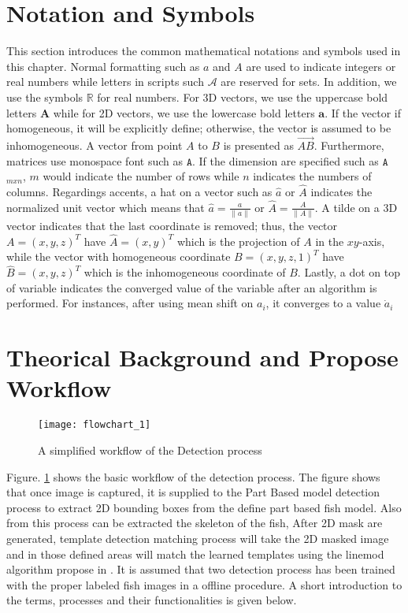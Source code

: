 \section{Notation and Symbols}
This section introduces the common mathematical notations and symbols used in this 
chapter.
Normal formatting such as $a$ and $A$ are used to indicate integers or real numbers 
while letters in scripts such $\mathcal{A}$ are reserved for sets. In addition, 
we use the symbols $\mathbb{R}$ for real numbers.
For 3D vectors, we use the uppercase bold letters $\mathbf{A}$ while for 2D vectors, 
we use the lowercase bold letters $\mathbf{a}$. If the vector if homogeneous, it will
be explicitly define; otherwise, the vector is assumed to be inhomogeneous. A vector
from point $A$ to $B$ is presented as $\overrightarrow{AB}$. Furthermore, matrices use
monospace font such as $\mathtt{A}$. If the dimension are specified such as $\mathtt{A}$$_{mxn}$,
$m$ would indicate the number of rows while $n$ indicates the numbers of columns.
Regardings accents, a hat on a vector such as $\hat{a}$ or $\hat{A}$ indicates the normalized
unit vector which means that $\hat{a}=\frac{a}{\|a\|}$ or $\hat{A}=\frac{A}{\|A\|}$.
A tilde on a 3D vector indicates that the last coordinate is removed; thus, the vector 
$A=(x,y,z)^T$ have $\hat{A}=(x,y)^T$  which is the projection of $A$ in the $xy$-axis,
while the vector with homogeneous coordinate $B=(x,y,z,1)^T$ have $\hat{B}=(x,y,z)^T$ 
which is the inhomogeneous coordinate of $B$. Lastly, a dot on top of variable indicates
the converged value of the variable after an algorithm is performed. For instances,
after using mean shift on $a_i$, it converges to a value $\dot{a}_i$

\section{Theorical Background and Propose Workflow}
\label{sec:workflow}

\begin{figure}[ht]
\centering
\texttt{[image: flowchart\_1]}
\caption{A simplified workflow of the Detection process}
\label{fig:basicworkflow}
\end{figure}

Figure. \ref{fig:basicworkflow} shows the basic workflow of the detection process. The figure 
shows that once image is captured, it is supplied to the Part Based model detection 
process to extract 2D bounding boxes from the define part based fish model. Also from
this process can be extracted the skeleton of the fish, After 2D mask are generated, 
template detection matching process will take the 2D masked image and in those defined
areas will match the learned templates using the linemod algorithm propose in \citet{Hinterstoisser2012}. It is assumed that two detection process has been trained with the
proper labeled fish images in a offline procedure. A short introduction to the terms, processes and their functionalities is given below.

